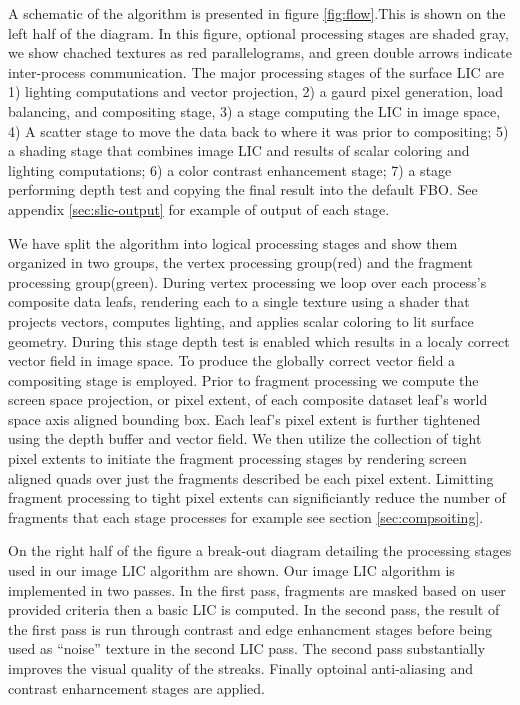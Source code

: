 \documentclass[a4paper,10pt]{article}
\begin{document}
A schematic of the algorithm is presented in figure \ref{fig:flow}.This is shown on the left half of the diagram. In this figure, optional processing stages are shaded gray, we show chached textures as red parallelograms, and green double arrows indicate inter-process communication. The major processing stages of the surface LIC are 1) lighting computations and vector projection, 2) a gaurd pixel generation, load balancing, and compositing stage, 3) a stage computing the LIC in image space, 4) A scatter stage to move the data back to where it was prior to compositing; 5) a shading stage that combines image LIC and results of scalar coloring and lighting computations; 6) a color contrast enhancement stage; 7) a stage performing depth test and copying the final result into the default FBO. See appendix \ref{sec:slic-output} for example of output of each stage.

We have split the algorithm into logical processing stages and show them organized in two groups, the vertex processing group(red) and the fragment processing  group(green). During vertex processing we loop over each process's composite data leafs, rendering each to a single texture using a shader that projects vectors, computes lighting, and applies scalar coloring to lit surface geometry. During this stage depth test is enabled which results in a localy correct vector field in image space. To produce the globally correct vector field a compositing stage is employed. Prior to fragment processing we compute the screen space projection, or pixel extent, of each composite dataset leaf's world space axis aligned bounding box. Each leaf's pixel extent is further tightened using the depth buffer and vector field. We then utilize the collection of tight pixel extents to initiate the fragment processing stages by rendering screen aligned quads over just the fragments described be each pixel extent. Limitting fragment processing to tight pixel extents can significiantly reduce the number of fragments that each stage processes for example see section \ref{sec:compsoiting}.

On the right half of the figure a break-out diagram detailing the processing stages used in our image LIC algorithm are shown. Our image LIC algorithm is implemented in two passes. In the first pass, fragments are masked based on user provided criteria\cite{surfacelic} then a basic LIC is computed\cite{imagelic}. In the second pass, the result of the first pass is run through contrast and edge enhancment stages before being used as ``noise'' texture in the second LIC pass. The second pass substantially improves the visual quality of the streaks.  Finally optoinal anti-aliasing and contrast enharncement stages are applied. 
\end{document}
